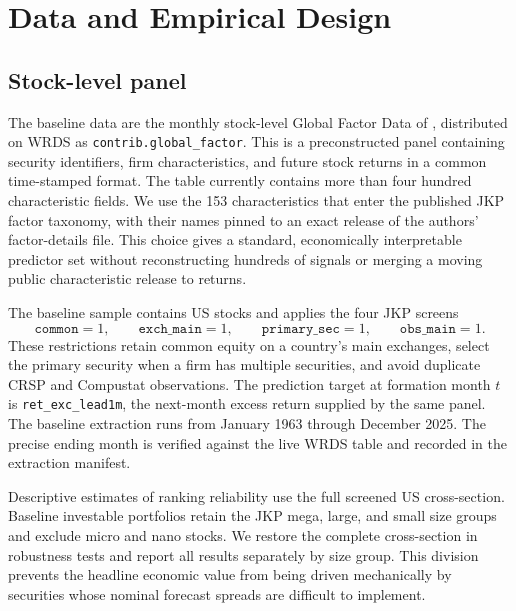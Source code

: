 \section{Data and Empirical Design}
\label{sec:data-design}

\subsection{Stock-level panel}

The baseline data are the monthly stock-level Global Factor Data of \citet{JensenKellyPedersen2023}, distributed on WRDS as \texttt{contrib.global\_factor}. This is a preconstructed panel containing security identifiers, firm characteristics, and future stock returns in a common time-stamped format. The table currently contains more than four hundred characteristic fields. We use the 153 characteristics that enter the published JKP factor taxonomy, with their names pinned to an exact release of the authors' factor-details file. This choice gives a standard, economically interpretable predictor set without reconstructing hundreds of signals or merging a moving public characteristic release to returns.

The baseline sample contains US stocks and applies the four JKP screens
\begin{equation}
\texttt{common}=1,
\qquad
\texttt{exch\_main}=1,
\qquad
\texttt{primary\_sec}=1,
\qquad
\texttt{obs\_main}=1.
\label{eq:jkp-screens}
\end{equation}
These restrictions retain common equity on a country's main exchanges, select the primary security when a firm has multiple securities, and avoid duplicate CRSP and Compustat observations. The prediction target at formation month $t$ is \texttt{ret\_exc\_lead1m}, the next-month excess return supplied by the same panel. The baseline extraction runs from January 1963 through December 2025. The precise ending month is verified against the live WRDS table and recorded in the extraction manifest.

Descriptive estimates of ranking reliability use the full screened US cross-section. Baseline investable portfolios retain the JKP mega, large, and small size groups and exclude micro and nano stocks. We restore the complete cross-section in robustness tests and report all results separately by size group. This division prevents the headline economic value from being driven mechanically by securities whose nominal forecast spreads are difficult to implement.

